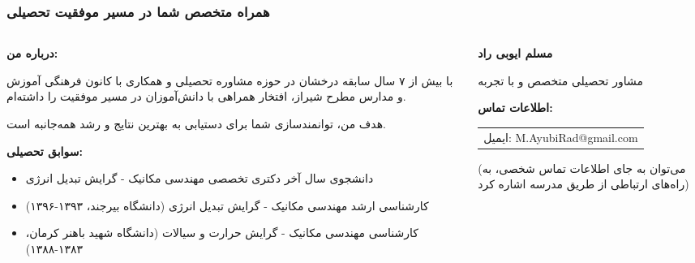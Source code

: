 \documentclass[aspectratio=169]{beamer}
\begin{document}
\begin{frame}[fragile]
  \frametitle{همراه متخصص شما در مسیر موفقیت تحصیلی}

  \begin{columns}[T,totalwidth=\textwidth] %
    \begin{column}{0.62\textwidth} %
      \small %
      \hfill\textbf{درباره من:}\hfill\mbox{}
      \par
      با بیش از ۷ سال سابقه درخشان در حوزه مشاوره تحصیلی و همکاری با کانون فرهنگی آموزش و مدارس مطرح شیراز، افتخار همراهی با دانش‌آموزان در مسیر موفقیت را داشته‌ام.
      \par
      هدف من، توانمندسازی شما برای دستیابی به بهترین نتایج و رشد همه‌جانبه است.
      \smallskip

      \hfill\textbf{سوابق تحصیلی:}\hfill\mbox{}
      \begin{itemize}\setlength{\itemsep}{0pt}\setlength{\parskip}{0pt} %
        \item دانشجوی سال آخر دکتری تخصصی مهندسی مکانیک - گرایش تبدیل انرژی
        \item کارشناسی ارشد مهندسی مکانیک - گرایش تبدیل انرژی (دانشگاه بیرجند، ۱۳۹۳-۱۳۹۶)
        \item کارشناسی مهندسی مکانیک - گرایش حرارت و سیالات (دانشگاه شهید باهنر کرمان، ۱۳۸۳-۱۳۸۸)
      \end{itemize}
      \normalsize %
    \end{column}

    \begin{column}{0.35\textwidth} %
      \centering %
      \textbf{مسلم ایوبی راد}
      \par\smallskip
      مشاور تحصیلی متخصص و با تجربه
      \par\medskip
      \textbf{اطلاعات تماس:}
      \par\smallskip
      \begin{tabular}{r}
        ایمیل: M.AyubiRad@gmail.com \\
      \end{tabular}
      \par\smallskip
      \footnotesize{(می‌توان به جای اطلاعات تماس شخصی، به راه‌های ارتباطی از طریق مدرسه اشاره کرد)}
    \end{column}
  \end{columns}
\end{frame}
\end{document}
